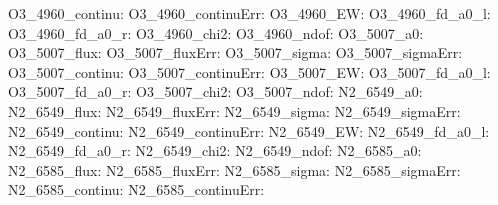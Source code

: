 O3\_4960\_continu:  \newline 
O3\_4960\_continuErr:  \newline 
O3\_4960\_EW:  \newline 
O3\_4960\_fd\_a0\_l:  \newline 
O3\_4960\_fd\_a0\_r:  \newline 
O3\_4960\_chi2:  \newline 
O3\_4960\_ndof:  \newline 
O3\_5007\_a0:  \newline 
O3\_5007\_flux:  \newline 
O3\_5007\_fluxErr:  \newline 
O3\_5007\_sigma:  \newline 
O3\_5007\_sigmaErr:  \newline 
O3\_5007\_continu:  \newline 
O3\_5007\_continuErr:  \newline 
O3\_5007\_EW:  \newline 
O3\_5007\_fd\_a0\_l:  \newline 
O3\_5007\_fd\_a0\_r:  \newline 
O3\_5007\_chi2:  \newline 
O3\_5007\_ndof:  \newline 
N2\_6549\_a0:  \newline 
N2\_6549\_flux:  \newline 
N2\_6549\_fluxErr:  \newline 
N2\_6549\_sigma:  \newline 
N2\_6549\_sigmaErr:  \newline 
N2\_6549\_continu:  \newline 
N2\_6549\_continuErr:  \newline 
N2\_6549\_EW:  \newline 
N2\_6549\_fd\_a0\_l:  \newline 
N2\_6549\_fd\_a0\_r:  \newline 
N2\_6549\_chi2:  \newline 
N2\_6549\_ndof:  \newline 
N2\_6585\_a0:  \newline 
N2\_6585\_flux:  \newline 
N2\_6585\_fluxErr:  \newline 
N2\_6585\_sigma:  \newline 
N2\_6585\_sigmaErr:  \newline 
N2\_6585\_continu:  \newline 
N2\_6585\_continuErr:  \newline 
